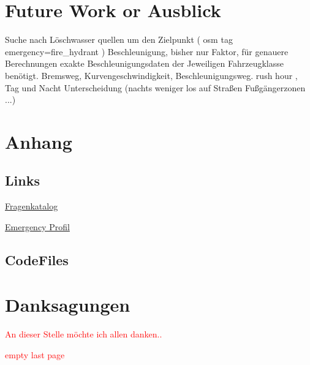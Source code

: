 \documentclass[12pt,a4paper]{article}
\newcommand\todo[1]{\textcolor{red}{#1}}
\begin{document}
\newpage
\section{Future Work or Ausblick}

Suche nach Löschwasser quellen um den Zielpunkt ( osm tag emergency=fire\_hydrant )
Beschleunigung, bisher nur Faktor, für genauere Berechnungen exakte Beschleunigungsdaten der Jeweiligen Fahrzeugklasse benötigt. Bremsweg, Kurvengeschwindigkeit, Beschleunigungsweg.
rush hour , Tag und Nacht Unterscheidung (nachts weniger los auf Straßen\/ Fußgängerzonen ...)

\newpage
\printbibliography

\newpage
\section*{Anhang}
\label{sec:anhang}

\subsection*{Links}

\href{https://docs.google.com/document/d/1nwjmea0jwauJWezk_2TMQs5CbAHv7he2NI4kxqMu2w4/}{Fragenkatalog}\par
\smallskip
\href{http://emergency.openrouteservice.org/reach?n1=48.456787&n2=10.823207&n3=14&a=48.454054,10.824484&b=5b&i=0&j1=5&j2=1&f3=3&f1=7.5&f2=2.5&f5=7&d=80&k1=en-US&k2=km}{Emergency Profil}

\subsection*{CodeFiles}

\newpage
\section*{Danksagungen}
\todo{An dieser Stelle möchte ich allen danken.. }

\newpage
\todo{empty last page}
\end{document}
